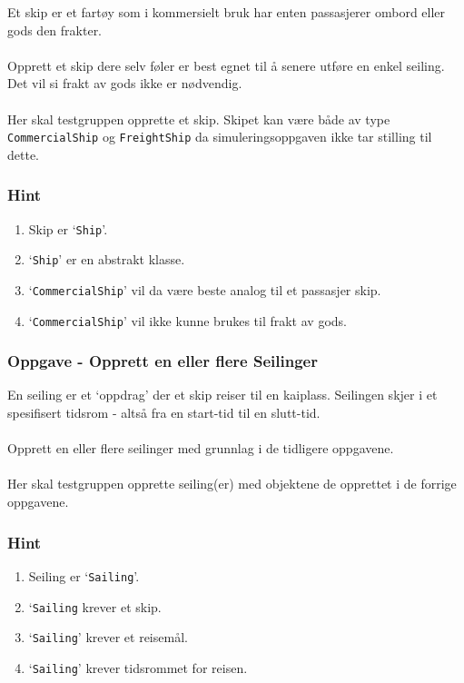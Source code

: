 \documentclass[12pt]{article}
\begin{document}
Et skip er et fartøy som i kommersielt bruk har enten passasjerer ombord eller gods den frakter. \\ \\
Opprett et skip dere selv føler er best egnet til å senere utføre en enkel seiling. Det vil si frakt av gods ikke er nødvendig. \\ \\
Her skal testgruppen opprette et skip. Skipet kan være både av type \texttt{CommercialShip} og \texttt{FreightShip} da simuleringsoppgaven
ikke tar stilling til dette.

\subsubsection*{Hint}

\begin{enumerate}
    \item Skip er `\texttt{Ship}'.
    \item `\texttt{Ship}' er en abstrakt klasse.
    \item `\texttt{CommercialShip}' vil da være beste analog til et passasjer skip.
    \item `\texttt{CommercialShip}' vil ikke kunne brukes til frakt av gods.
\end{enumerate}

\subsubsection{Oppgave - Opprett en eller flere Seilinger}

En seiling er et `oppdrag' der et skip reiser til en kaiplass. Seilingen skjer i et spesifisert tidsrom - altså fra en start-tid til en slutt-tid. \\ \\
Opprett en eller flere seilinger med grunnlag i de tidligere oppgavene. \\ \\
Her skal testgruppen opprette seiling(er) med objektene de opprettet i de forrige oppgavene. 

\subsubsection*{Hint}

\begin{enumerate}
    \item Seiling er `\texttt{Sailing}'.
    \item `\texttt{Sailing} krever et skip.
    \item `\texttt{Sailing}' krever et reisemål.
    \item `\texttt{Sailing}' krever tidsrommet for reisen.
\end{enumerate}
\end{document}
